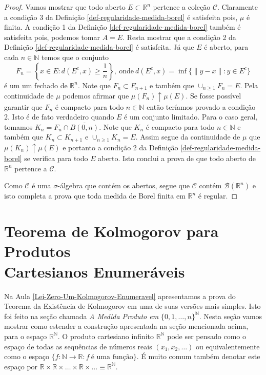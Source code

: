 \begin{proof}
Vamos mostrar que todo aberto $E\subset \mathbb{R}^n$ 
pertence a coleção $\mathscr{C}$. Claramente 
a condição 3 da Definição \ref{def-regularidade-medida-borel}
é satisfeita pois, $\mu$ é finita. A condição 1
da Definição \ref{def-regularidade-medida-borel} 
também é satisfeita pois, podemos 
tomar $A=E$. Resta mostrar que a condição 2 
da Definição \ref{def-regularidade-medida-borel} 
é satisfeita. Já que $E$ é aberto, para cada $n\in\mathbb{N}$ 
temos que o conjunto 
\[
F_n = 
\left\{
x\in E: d(E^c,x)\geq \frac{1}{n}
\right\},
\ \text{onde}\ 
d(E^c,x) = \inf\{\|y-x\|: y\in E^c\}
\]
é um um fechado de $\mathbb{R}^n$. 
Note que $F_n\subset F_{n+1}$ e 
também que $\cup_{n\geq 1} F_n =E$. Pela continuidade
de $\mu$ podemos afirmar que $\mu(F_n) \uparrow \mu(E)$. 
Se fosse possível garantir que $F_n$ é compacto 
para todo $n\in\mathbb{N}$ então teríamos provado 
a condição 2. 
Isto é de fato verdadeiro quando $E$ é um conjunto limitado.
Para o caso geral, tomamos $K_n = F_n\cap \overline{B(0,n)}$.
Note que $K_n$ é compacto para todo $n\in\mathbb{N}$ e também 
que $K_n\subset K_{n+1}$ e  $\cup_{n\geq 1} K_n = E$. 
Assim segue da continuidade de $\mu$ que 
$\mu(K_n)\uparrow \mu(E)$ e portanto 
a condição 2 da Definição \ref{def-regularidade-medida-borel}
se verifica para todo $E$ aberto. 
Isto conclui a prova de que todo aberto de $\mathbb{R}^n$
pertence a $\mathscr{C}$. 


Como $\mathscr{C}$ é uma 
$\sigma$-álgebra que contém os abertos, segue que 
$\mathscr{C}$ contém $\mathscr{B}(\mathbb{R}^n)$ e isto 
completa a prova que toda medida de Borel finita em $\mathbb{R}^n$
é regular.   
\end{proof}












\section[Teorema de Kolmogorov para Produtos Cartesianos Enumeráveis]
{Teorema de Kolmogorov para Produtos\\ Cartesianos Enumeráveis}

Na Aula \ref{Lei-Zero-Um-Kolmogorov-Enumeravel}
apresentamos a prova do Teorema da Existência 
de Kolmogorov em uma de suas versões mais simples.
Isto foi feito na seção chamada 
{\it A Medida Produto em $\{0,1,\ldots,n\}^{\mathbb{N}}$}.
Nesta seção vamos mostrar como estender a construção 
apresentada na seção mencionada acima, para o espaço
$\mathbb{R}^{\mathbb{N}}$. O produto cartesiano infinito 
$\mathbb{R}^{\mathbb{N}}$ pode ser pensado como o espaço
de todas as sequências de números reais $(x_1,x_2,\ldots)$
ou equivalentemente como o espaço 
$\{f:\mathbb{N}\to\mathbb{R}: f\ \text{é uma função} \}$.
É muito comum também denotar este espaço por 
$
\mathbb{R}\times\mathbb{R}
\times\ldots\times\mathbb{R}\times\ldots
\equiv 
\mathbb{R}^{\mathbb{N}}
$.

